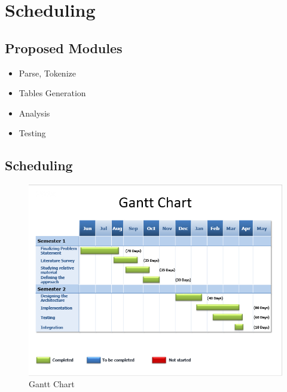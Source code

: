 \chapter{Scheduling}


\section{Proposed Modules}
\begin{itemize}
\item Parse, Tokenize
\item Tables Generation
\item Analysis
\item Testing
\end{itemize}
\section{Scheduling}
\begin{figure}[H]
\centering
\includegraphics[scale=0.7]{gantt_chart.png}
\caption{ Gantt Chart }
\label{<<Label>>}
\end{figure}
